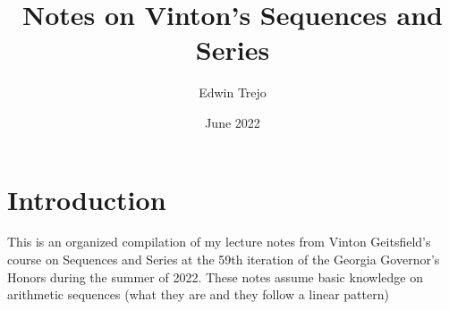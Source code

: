 \documentclass{article}
\title{Notes on Vinton's Sequences and Series}
\author{Edwin Trejo}
\date{June 2022}
\begin{document}
\maketitle

\section{Introduction}

This is an organized compilation of my lecture notes from Vinton Geitsfield's course on Sequences and Series at the 59th iteration of the Georgia Governor's Honors during the summer of 2022. 
These notes assume basic knowledge on arithmetic sequences (what they are and they follow a linear pattern)










\end{document}
